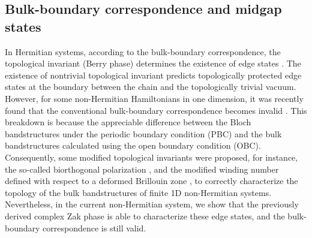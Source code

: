 \documentclass[aps,pra,reprint,groupedaddress,nofootinbib,longbibliography,showpacs]{revtex4-1}
\begin{document}
\subsection{Bulk-boundary correspondence and midgap states}
In Hermitian systems, according to the bulk-boundary correspondence, the topological invariant (Berry phase) determines the existence of edge states \cite{luNPhoton2014,khanikaevNPhoton2017,rhimPRB2017,ozawa2018topological}. The existence of nontrivial topological invariant predicts topologically protected edge states at the boundary between the chain and the topologically trivial vacuum. However, for some non-Hermitian Hamiltonians in one dimension, it was recently found that the conventional bulk-boundary correspondence becomes invalid \cite{yao2018edge,kunst2018biorthogonal,xiongJPC2018}. This breakdown is because the appreciable difference between the Bloch bandstructures under the periodic boundary condition (PBC) and the bulk bandstructures calculated using the open boundary condition (OBC).  Consequently, some modified topological invariants were proposed, for instance, the so-called biorthogonal polarization \cite{kunst2018biorthogonal}, and the modified winding number defined with respect to a deformed Brillouin zone \cite{yao2018edge}, to correctly characterize the topology of the bulk bandstructures of finite 1D non-Hermitian systems. Nevertheless, in the current non-Hermitian system, we show that the previously derived complex Zak phase is able to characterize these edge states, and the bulk-boundary correspondence is still valid.  
\end{document}
